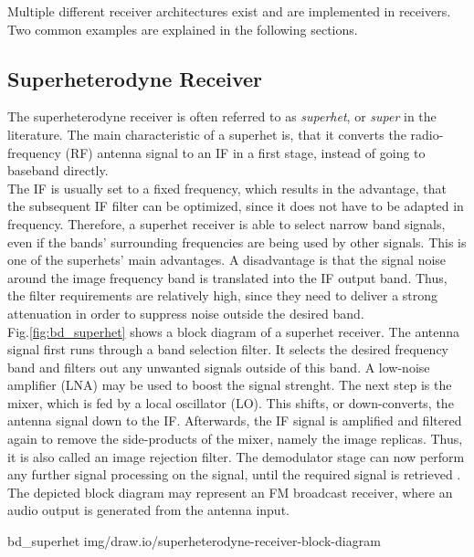 Multiple different receiver architectures exist and are implemented in receivers.
Two common examples are explained in the following sections.

\subsection{Superheterodyne Receiver}

The superheterodyne receiver is often referred to as \textit{superhet}, or \textit{super} in the literature.
The main characteristic of a superhet is, that it converts the radio-frequency (RF) antenna signal to an IF in a first stage, instead of going to baseband directly.\\

The IF is usually set to a fixed frequency, which results in the advantage, that the subsequent IF filter can be optimized, since it does not have to be adapted in frequency.
Therefore, a superhet receiver is able to select narrow band signals, even if the bands' surrounding frequencies are being used by other signals.
This is one of the superhets' main advantages.
A disadvantage is that the signal noise around the image frequency band is translated into the IF output band.
Thus, the filter requirements are relatively high, since they need to deliver a strong attenuation in order to suppress noise outside the desired band.\\

Fig.\ref{fig:bd_superhet} shows a block diagram of a superhet receiver.
The antenna signal first runs through a band selection filter.
It selects the desired frequency band and filters out any unwanted signals outside of this band.
A low-noise amplifier (LNA) may be used to boost the signal strenght.
The next step is the mixer, which is fed by a local oscillator (LO).
This shifts, or down-converts, the antenna signal down to the IF.
Afterwards, the IF signal is amplified and filtered again to remove the side-products of the mixer, namely the image replicas.
Thus, it is also called an image rejection filter.
The demodulator stage can now perform any further signal processing on the signal, until the required signal is retrieved \cite{PassosFábio2020AHSo}.\\

The depicted block diagram may represent an FM broadcast receiver, where an audio output is generated from the antenna input.

 {bd_superhet} {img/draw.io/superheterodyne-receiver-block-diagram}

